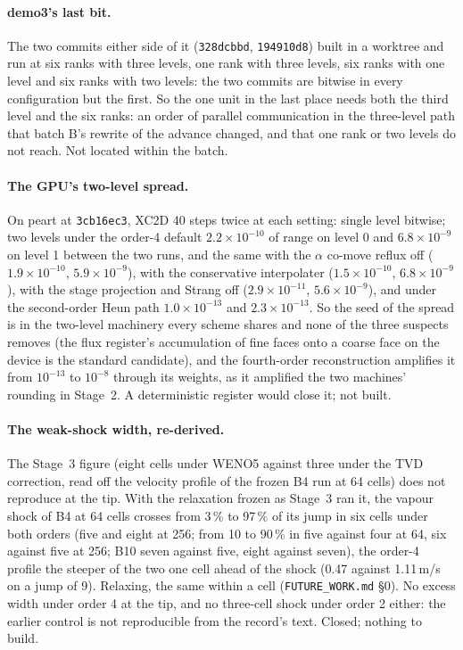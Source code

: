 \documentclass[11pt,a4paper]{article}
\newcommand{\code}[1]{\texttt{\small #1}}
\begin{document}
\paragraph{demo3's last bit.}  The two commits either side of it
(\code{328dcbbd}, \code{194910d8}) built in a worktree and run at six
ranks with three levels, one rank with three levels, six ranks with one
level and six ranks with two levels: the two commits are bitwise in
every configuration but the first.  So the one unit in the last place
needs both the third level and the six ranks: an order of parallel
communication in the three-level path that batch B's rewrite of the
advance changed, and that one rank or two levels do not reach.  Not
located within the batch.

\paragraph{The GPU's two-level spread.}  On peart at \code{3cb16ec3},
XC2D 40 steps twice at each setting: single level bitwise; two levels
under the order-4 default $2.2\times10^{-10}$ of range on level 0 and
$6.8\times10^{-9}$ on level 1 between the two runs, and the same
with the $\alpha$ co-move reflux off ($1.9\times10^{-10}$,
$5.9\times10^{-9}$), with the conservative interpolater
($1.5\times10^{-10}$, $6.8\times10^{-9}$), with the stage projection
and Strang off ($2.9\times10^{-11}$, $5.6\times10^{-9}$), and under the
second-order Heun path $1.0\times10^{-13}$ and $2.3\times10^{-13}$.  So
the seed of the spread is in the two-level machinery every scheme
shares and none of the three suspects removes (the flux register's
accumulation of fine faces onto a coarse face on the device is the
standard candidate), and the fourth-order reconstruction amplifies it
from $10^{-13}$ to $10^{-8}$ through its weights, as it amplified the
two machines' rounding in Stage~2.  A deterministic register would
close it; not built.

\paragraph{The weak-shock width, re-derived.}  The Stage~3 figure
(eight cells under WENO5 against three under the TVD correction, read
off the velocity profile of the frozen B4 run at 64 cells) does not
reproduce at the tip.  With the relaxation frozen as Stage~3 ran it,
the vapour shock of B4 at 64 cells crosses from 3\,\% to 97\,\% of its
jump in six cells under both orders (five and eight at 256; from 10 to
90\,\% in five against four at 64, six against five at 256; B10 seven
against five, eight against seven), the order-4 profile the steeper of
the two one cell ahead of the shock (0.47 against 1.11\,m/s on a jump of
9).  Relaxing, the same within a cell (\code{FUTURE\_WORK.md} \S0).  No
excess width under order 4 at the tip, and no three-cell shock under
order 2 either: the earlier control is not reproducible from the
record's text.  Closed; nothing to build.
\end{document}
